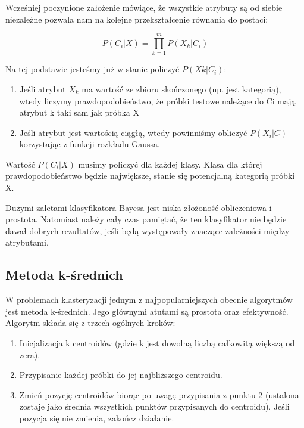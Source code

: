 Wcześniej poczynione założenie mówiące, że wszystkie atrybuty są od siebie niezależne pozwala nam na kolejne przekształcenie równania do postaci:

\[ P(C_i|X) = \prod^{m}_{k=1} P(X_k|C_i) \]

Na tej podstawie jesteśmy już w stanie policzyć $P(Xk|C_i)$:

\begin{enumerate}
    \item Jeśli atrybut $X_k$ ma wartość ze zbioru skończonego (np. jest kategorią), wtedy liczymy prawdopodobieństwo, że próbki testowe należące do Ci mają atrybut k taki sam jak próbka X
    
    \item Jeśli atrybut jest wartością ciągłą, wtedy powinniśmy obliczyć $P(X_i|C)$ korzystając z funkcji rozkładu Gaussa.
\end{enumerate}

Wartość $P(C_i|X)$ musimy policzyć dla każdej klasy. Klasa dla której prawdopodobieństwo będzie największe, stanie się potencjalną kategorią próbki X.

Dużymi zaletami klasyfikatora Bayesa jest niska złożoność obliczeniowa i prostota. Natomiast należy cały czas pamiętać, że ten klasyfikator nie będzie dawał dobrych rezultatów, jeśli będą występowały znaczące zależności między atrybutami.

\subsection{Metoda k-średnich}

W problemach klasteryzacji jednym z najpopularniejszych obecnie algorytmów jest metoda k-średnich. Jego głównymi atutami są prostota oraz efektywność. Algorytm składa się z trzech ogólnych kroków:

\begin{enumerate}
    \item Inicjalizacja k centroidów (gdzie k jest dowolną liczbą całkowitą większą od zera).
    
    \item Przypisanie każdej próbki do jej najbliższego centroidu.

    \item Zmień pozycję centroidów biorąc po uwagę przypisania z punktu 2 (ustalona zostaje jako średnia wszystkich punktów przypisanych do centroidu). Jeśli pozycja się nie zmienia, zakończ działanie.
\end{enumerate}

